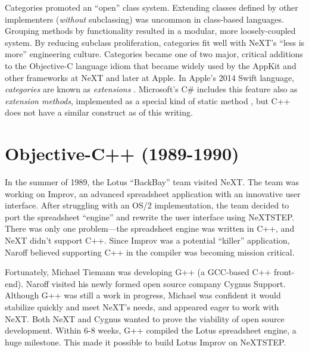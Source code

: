 \documentclass[acmsmall,screen]{acmart}
\begin{document}
Categories promoted an ``open'' class system. Extending classes defined by other implementers (\emph{without} subclassing) was uncommon in class-based languages. Grouping methods by functionality resulted in a modular, more loosely-coupled system. By reducing subclass proliferation, categories fit well with NeXT's ``less is more'' engineering culture. Categories became one of two major, critical additions to the Objective-C language idiom that became widely used by the AppKit and other frameworks at NeXT and later at Apple. In Apple's 2014 Swift language, \emph{categories} are known as \emph{extensions} . Microsoft's C\# includes this feature also as \emph{extension methods}, implemented as a special kind of static method , but C++ does not have a similar construct as of this writing.

\section{Objective-C++ (1989-1990)}
\label{sec-ObjC++1989-1990}
In the summer of 1989, the Lotus ``BackBay'' team visited NeXT. The team was working on Improv, an advanced spreadsheet application with an innovative user interface. After struggling with an OS/2 implementation, the team decided to port the spreadsheet ``engine'' and rewrite the user interface using NeXTSTEP. There was only one problem---the spreadsheet engine was written in C++, and NeXT didn't support C++. Since Improv was a potential ``killer'' application, Naroff believed supporting C++ in the compiler was becoming mission critical.

Fortunately, Michael Tiemann was developing G++ (a GCC-based C++ front-end). Naroff visited his newly formed open source company Cygnus Support. Although G++ was still a work in progress, Michael was confident it would stabilize quickly and meet NeXT's needs, and appeared eager to work with NeXT. Both NeXT and Cygnus wanted to prove the viability of open source development. Within 6-8 weeks, G++ compiled the Lotus spreadsheet engine, a huge milestone. This made it possible to build Lotus Improv on NeXTSTEP.
\end{document}
